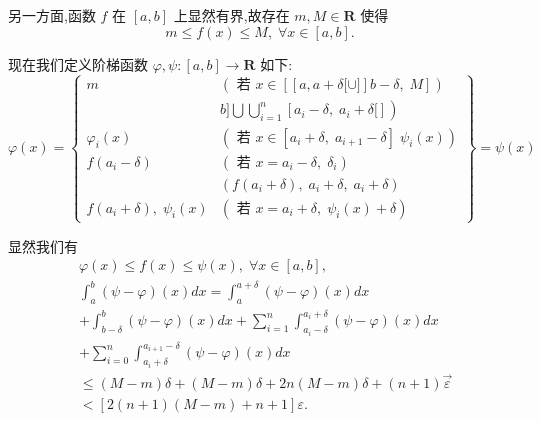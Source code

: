 另一方面,函数 $f$ 在 $\left\lbrack  {a,b}\right\rbrack$ 上显然有界,故存在 $m,M \in  \mathbf{R}$ 使得
$$m \leq  f\left( x\right)  \leq  M,\;\forall x \in  \left\lbrack  {a,b}\right\rbrack  .$$

现在我们定义阶梯函数 $\varphi ,\psi  : \left\lbrack  {a,b}\right\rbrack   \rightarrow  \mathbf{R}$ 如下:
$$\varphi \left( x\right)  = \left\{  \begin{matrix} m & \left( {\text{ 若 }x \in  \left\lbrack  {\left\lbrack  {a,a + \delta \lbrack  \cup  \rbrack }\right\rbrack  b - \delta ,\;M}\right\rbrack  }\right) \\   & \left. {b\rbrack \bigcup \mathop{\bigcup }\limits_{{i = 1}}^{n}\left\lbrack  {{a}_{i} - \delta ,\;{a}_{i} + \delta \lbrack }\right\rbrack  }\right) \\  {\varphi }_{i}\left( x\right) & \left( {\text{ 若 }x \in  \left\lbrack  {{a}_{i} + \delta ,\;{a}_{i + 1} - \delta }\right\rbrack  \;{\psi }_{i}\left( x\right) }\right) \\  f\left( {{a}_{i} - \delta }\right) & \left( {\text{ 若 }x = {a}_{i} - \delta ,\;{\delta }_{i}}\right) \\   & \left( {f\left( {{a}_{i} + \delta }\right) ,\;{a}_{i} + \delta ,\;{a}_{i} + \delta }\right) \\  f\left( {{a}_{i} + \delta }\right) ,\;{\psi }_{i}\left( x\right) & \left( {\text{ 若 }x = {a}_{i} + \delta ,\;{\psi }_{i}\left( x\right)  + \delta }\right)  \end{matrix}\right\}   = \psi \left( x\right)$$

显然我们有
\begin{align*}
	&\varphi \left( x\right)  \leq  f\left( x\right)  \leq  \psi \left( x\right) ,\;\forall x \in  \left\lbrack  {a,b}\right\rbrack  ,\\
	&{\int }_{a}^{b}\left( {\psi  - \varphi }\right) \left( x\right) {dx} = {\int }_{a}^{a + \delta }\left( {\psi  - \varphi }\right) \left( x\right) {dx}\\
	&+ {\int }_{b - \delta }^{b}\left( {\psi  - \varphi }\right) \left( x\right) {dx} + \mathop{\sum }\limits_{{i = 1}}^{n}{\int }_{{a}_{i} - \delta }^{{a}_{i} + \delta }\left( {\psi  - \varphi }\right) \left( x\right) {dx}\\
	&+ \mathop{\sum }\limits_{{i = 0}}^{n}{\int }_{{a}_{i} + \delta }^{{a}_{i + 1} - \delta }\left( {\psi  - \varphi }\right) \left( x\right) {dx}\\
	&\leq  \left( {M - m}\right) \delta  + \left( {M - m}\right) \delta  + {2n}\left( {M - m}\right) \delta  + \left( {n + 1}\right) \overrightarrow{\varepsilon }\\
	&< \left\lbrack  {2\left( {n + 1}\right) \left( {M - m}\right)  + n + 1}\right\rbrack  \varepsilon .
\end{align*}


